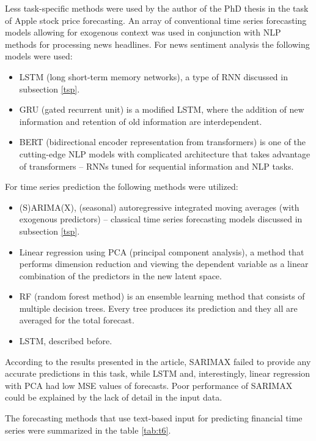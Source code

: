 \documentclass[13pt, a4paper]{article}
\begin{document}
Less task-specific methods were used by the author of the PhD thesis \cite{jeong2022predicting} in the task of Apple stock price forecasting. An array of conventional time series forecasting models allowing for exogenous context was used in conjunction with NLP methods for processing news headlines. For news sentiment analysis the following models were used:
\begin{itemize}
	\item LSTM (long short-term memory networks), a type of RNN discussed in subsection \ref{tsp}.
	\item GRU (gated recurrent unit) is a modified LSTM, where the addition of new information and retention of old information are interdependent.
	\item BERT (bidirectional encoder representation from transformers) is one of the cutting-edge NLP models with complicated architecture that takes advantage of transformers -- RNNs tuned for sequential information and NLP tasks.
\end{itemize}

For time series prediction the following methods were utilized:
\begin{itemize}
	\item (S)ARIMA(X), (seasonal) autoregressive integrated moving averages (with exogenous predictors) -- classical time series forecasting models discussed in subsection \ref{tsp}.
	\item Linear regression using PCA (principal component analysis), a method that performs dimension reduction and viewing the dependent variable as a linear combination of the predictors in the new latent space. 
	\item RF (random forest method) is an ensemble learning method that consists of multiple decision trees. Every tree produces its prediction and they all are averaged for the total forecast. 
	\item LSTM, described before.
\end{itemize}

According to the results presented in the article, SARIMAX failed to provide any accurate predictions in this task, while LSTM and, interestingly, linear regression with PCA had low MSE values of forecasts. Poor performance of SARIMAX could be explained by the lack of detail in the input data.

The forecasting methods that use text-based input for predicting financial time series were summarized in the table \ref{tab:t6}.
\end{document}
